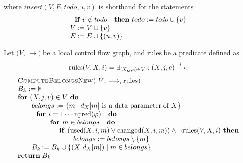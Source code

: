 where $insert(V,E,todo,u,v)$ is shorthand for the statements%
\begin{equation*}
\begin{array}{l}
\text{\textbf{if} }v\notin todo\text{ \textbf{then} }todo:=todo\cup \{v\} \\ 
V:=V\cup \{v\} \\ 
E:=E\cup \{(u,v)\}%
\end{array}%
\end{equation*}%
\newpage 

Let $(V$, $\mathrm{\longrightarrow })$ be a local control flow graph, and $%
\mathrm{rules}$ be a predicate defined as%
\begin{equation*}
\mathrm{rules}(V,X,i)=\exists _{(X,j,e)\in V}:(X,j,e)\overset{i}{\mathrm{%
\longrightarrow }}.
\end{equation*}
\begin{equation*}
\begin{tabular}{l}
\textsc{ComputeBelongsNew(} $V$, $\mathrm{\longrightarrow }$, $\mathrm{rules}
$\textsc{)} \\ 
$B_{k}:=\emptyset $ \\ 
\textbf{for} $(X,j,v)\in V$ \textbf{do} \\ 
$\qquad belongs:=\{m\mid d_{X}[m]$ is a data parameter of $X\}$ \\ 
$\qquad \text{\textbf{for }}i=1\cdots \mathrm{npred}(\varphi )\text{ \textbf{%
do}}$ \\ 
$\qquad \qquad \text{\textbf{for }}m\in belongs\text{ \textbf{do}}$ \\ 
$\qquad \qquad \qquad $\textbf{if }$\left( \mathrm{used}(X,i,m)\vee \mathrm{%
changed}(X,i,m)\right) \wedge \lnot \mathrm{rules}(V,X,i)$ \textbf{then} \\ 
$\qquad \qquad \qquad \qquad belongs:=belongs\setminus \{m\}$ \\ 
$\qquad B_{k}:=B_{k}\cup \{(X,d_{X}[m])\mid m\in belongs\}$ \\ 
\textbf{return} $B_{k}$%
\end{tabular}%
\end{equation*}%
